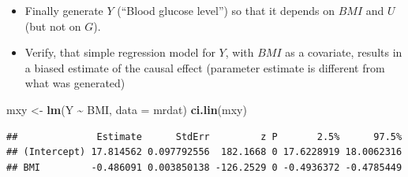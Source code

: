 \documentclass[
]{book}
\newenvironment{Shaded}{\begin{snugshade}}{\end{snugshade}}
\newcommand{\AttributeTok}[1]{\textcolor[rgb]{0.13,0.29,0.53}{#1}}
\newcommand{\DecValTok}[1]{\textcolor[rgb]{0.00,0.00,0.81}{#1}}
\newcommand{\FloatTok}[1]{\textcolor[rgb]{0.00,0.00,0.81}{#1}}
\newcommand{\FunctionTok}[1]{\textcolor[rgb]{0.13,0.29,0.53}{\textbf{#1}}}
\newcommand{\NormalTok}[1]{#1}
\newcommand{\OtherTok}[1]{\textcolor[rgb]{0.56,0.35,0.01}{#1}}
\newcommand{\SpecialCharTok}[1]{\textcolor[rgb]{0.81,0.36,0.00}{\textbf{#1}}}
\providecommand{\tightlist}{%
  \setlength{\itemsep}{0pt}\setlength{\parskip}{0pt}}
\theoremstyle{definition}
\theoremstyle{definition}
\theoremstyle{definition}
\theoremstyle{definition}
\theoremstyle{remark}
\begin{document}
\begin{Shaded}
\end{Shaded}

\begin{itemize}
\tightlist
\item
  Finally generate \(Y\) (``Blood glucose level'') so that it depends on \(BMI\) and \(U\) (but not on \(G\)).
\end{itemize}

\begin{Shaded}
\end{Shaded}

\begin{itemize}
\tightlist
\item
  Verify, that simple regression model for \(Y\), with \(BMI\) as a covariate, results in a biased estimate of the causal effect (parameter estimate is different from what was generated)
\end{itemize}

\begin{Shaded}
\begin{Highlighting}[]
\NormalTok{mxy }\OtherTok{\textless{}{-}} \FunctionTok{lm}\NormalTok{(Y }\SpecialCharTok{\textasciitilde{}}\NormalTok{ BMI, }\AttributeTok{data =}\NormalTok{ mrdat)}
\FunctionTok{ci.lin}\NormalTok{(mxy)}
\end{Highlighting}
\end{Shaded}

\begin{verbatim}
##              Estimate      StdErr         z P       2.5%      97.5%
## (Intercept) 17.814562 0.097792556  182.1668 0 17.6228919 18.0062316
## BMI         -0.486091 0.003850138 -126.2529 0 -0.4936372 -0.4785449
\end{verbatim}
\end{document}
